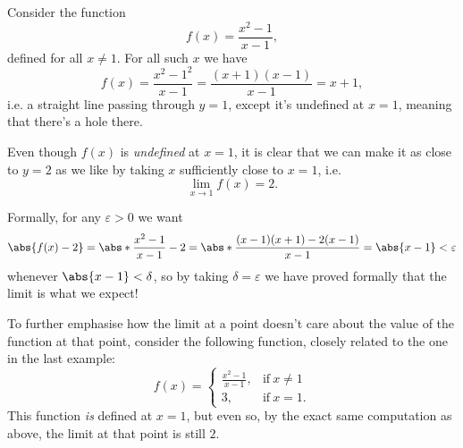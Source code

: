 \begin{example}\label{lec1:linewithhole}
	Consider the function
	\[
		f(x) = \frac{x^2 - 1}{x - 1},
	\]
	defined for all $x \neq 1$. For all such $x$ we have
	\[
		f(x) = \frac{x^2 - 1^2}{x - 1} = \frac{(x + 1)(x - 1)}{x - 1} = x + 1,
	\]
	i.e. a straight line passing through $y = 1$, except it's undefined at $x = 1$, meaning that there's a hole there.

	\begin{figure}[H]
		\centering
	\end{figure}

	\noindent
	Even though $f(x)$ is \emph{undefined} at $x = 1$, it is clear that we can make it as close to $y = 2$ as we like by taking $x$ sufficiently close to $x = 1$, i.e.
	\[
		\lim_{x \to 1} f(x) = 2.
	\]

	\noindent
	Formally, for any $\varepsilon > 0$ we want
	\[
		\abs{f(x) - 2} = \abs*{\frac{x^2 - 1}{x - 1} - 2} = \abs*{\frac{(x - 1)(x + 1) - 2 (x - 1)}{x - 1}} = \abs{x - 1} < \varepsilon
	\]
	whenever $\abs{x - 1} < \delta$, so by taking $\delta = \varepsilon$ we have proved formally that the limit is what we expect!
\end{example}

\begin{example}
	To further emphasise how the limit at a point doesn't care about the value of the function at that point, consider the following function, closely related to the one in the last example:
	\[
		f(x) = \begin{cases}
		\frac{x^2 - 1}{x - 1}, & \text{if}~ x \neq 1 \\
		3, & \text{if}~ x = 1.
		\end{cases}
	\]
	This function \emph{is} defined at $x = 1$, but even so, by the exact same computation as above, the limit at that point is still $2$.
\end{example}

